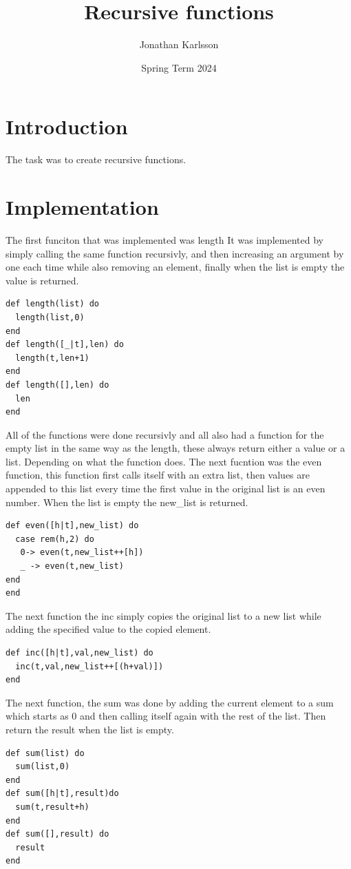 \documentclass[a4paper,11pt]{article}
\begin{document}
\title{
    \textbf{Recursive functions}
}
\author{Jonathan Karlsson}
\date{Spring Term 2024}

\maketitle

\section*{Introduction}

The task was to create recursive functions.
\section*{Implementation}

The first funciton that was implemented was length It was implemented by simply calling the same function recursivly, and then increasing an argument by one each time while also removing an element, finally when the list is empty the value is returned.
\begin{verbatim}
def length(list) do
  length(list,0)
end
def length([_|t],len) do
  length(t,len+1)
end
def length([],len) do
  len
end
\end{verbatim}
All of the functions were done recursivly and all also had a function for the empty list in the same way as the length, these always return either a value or a list. Depending on what the function does. 
The next fucntion was the even function, this function first calls itself with an extra list, then values are appended to this list every time the first value in the original list is an even number. When the list is empty the new\_list is returned.
\begin{verbatim}
def even([h|t],new_list) do
  case rem(h,2) do
   0-> even(t,new_list++[h])
   _ -> even(t,new_list)
end
end
\end{verbatim}
The next function the inc simply copies the original list to a new list while adding the specified value to the copied element.
\begin{verbatim}
def inc([h|t],val,new_list) do
  inc(t,val,new_list++[(h+val)])
end
\end{verbatim}
The next function, the sum was done by adding the current element to a sum which starts as 0 and then calling itself again with the rest of the list. Then return the result when the list is empty.
\begin{verbatim}
def sum(list) do
  sum(list,0)
end
def sum([h|t],result)do
  sum(t,result+h)
end
def sum([],result) do
  result
end
\end{verbatim}
\end{document}
